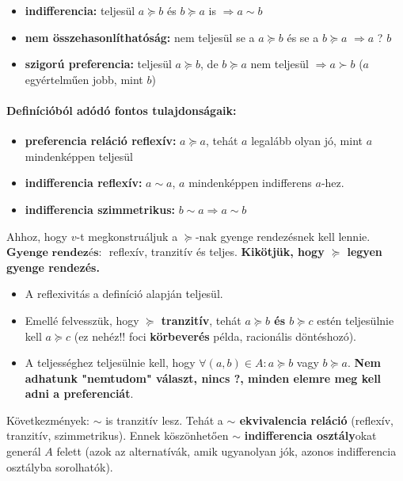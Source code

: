 \documentclass[a4paper,12pt]{article}
\begin{document}
\begin{itemize}
\item \textbf{indifferencia:}  teljesül $a \succeq b $ és $b \succeq a$ is $\Rightarrow a \sim b$
\item \textbf{nem összehasonlíthatóság:}  nem teljesül se a $a \succeq b $ és se a $b \succeq a $  $\Rightarrow a$ ? $b$
\item \textbf{szigorú preferencia:} teljesül $a \succeq b $, de $b \succeq a$ nem teljesül $\Rightarrow a \succ b$ ($a$ egyértelműen jobb, mint $b$)
\end{itemize}

\paragraph{Definícióból adódó fontos tulajdonságaik:}

\begin{itemize}
\item \textbf{preferencia reláció reflexív: } $a \succeq a $, tehát $a$ legalább olyan jó, mint $a$ mindenképpen teljesül 
\item \textbf{indifferencia reflexív:} $a \sim a $, $a$ mindenképpen indifferens $a$-hez.
\item \textbf{indifferencia szimmetrikus:}  $b \sim a \Rightarrow a \sim b$  
\end{itemize}

Ahhoz, hogy $v$-t megkonstruáljuk a $\succeq$-nak gyenge rendezésnek kell lennie. $\textbf{Gyenge rendezés: }$  reflexív, tranzitív és teljes. \textbf{Kikötjük, hogy $\succeq$ legyen gyenge rendezés.}
\begin{itemize}
\item A reflexivitás a definíció alapján teljesül. 
\item Emellé felvesszük, hogy \textbf{$\succeq$ tranzitív}, tehát \textbf{$a \succeq b$ és $b \succeq c$} estén teljesülnie kell \textbf{$a \succeq c$} (ez nehéz!! foci \textbf{körbeverés} példa, racionális döntéshozó). 
\item A teljességhez teljesülnie kell, hogy $\forall (a,b) \in A: a \succeq b$ vagy $b \succeq a$. \textbf{Nem adhatunk "nemtudom" választ, nincs ?, minden elemre meg kell adni a preferenciát}.  
\end{itemize}
Következmények:  $\sim$ is tranzitív lesz. Tehát a \textbf{$\sim$ ekvivalencia reláció} (reflexív, tranzitív, szimmetrikus). Ennek köszönhetően $\sim$ \textbf{indifferencia osztály}okat generál $A$ felett (azok az alternatívák, amik ugyanolyan jók, azonos indifferencia osztályba sorolhatók).
\end{document}
